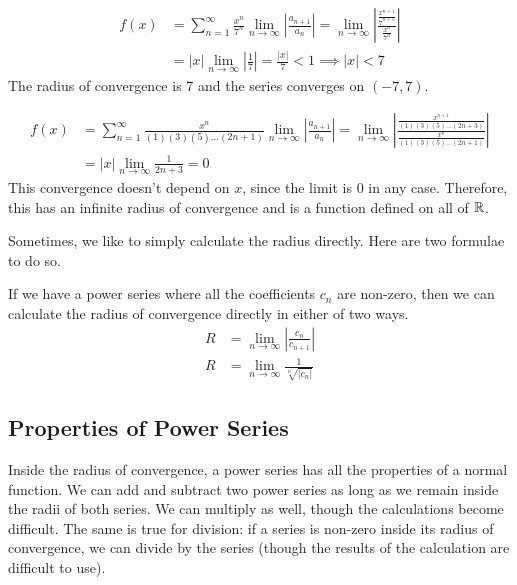 \documentclass[fleqn]{report}
\begin{document}
\begin{example}
\begin{align*}
f(x) & = \sum_{n=1}^\infty \frac{x^n}{7^n} 
\lim_{n \rightarrow \infty} \left| \frac{a_{n+1}}{a_n} \right| = 
\lim_{n \rightarrow \infty} \left|
\frac{\frac{x^{n+1}}{7^{n+1}}}{\frac{x^n}{7^n}} \right| \\
& = |x| \lim_{n \rightarrow \infty} \left| \frac{1}{7} \right| =
\frac{|x|}{7} < 1 \implies |x| < 7 
\end{align*}
The radius of convergence is 7 and the series converges on
$(-7,7)$.
\end{example}

\begin{example}
\begin{align*}
f(x) & = \sum_{n=1}^\infty \frac{x^n}{(1)(3)(5) \ldots (2n+1)}
\lim_{n \rightarrow \infty} \left| \frac{a_{n+1}}{a_n} \right| = 
\lim_{n \rightarrow \infty} \left|
\frac{\frac{x^{n+1}}{(1)(3)(5) \ldots
(2n+3)}}{\frac{x^n}{(1)(3)(5)\ldots (2n+1)}} \right|\\
& = |x| \lim_{n \rightarrow \infty} \frac{1}{2n+3} = 0
\end{align*}
This convergence doesn't depend on $x$, since the limit is $0$
in any case. Therefore, this has an infinite radius of
convergence and is a function defined on all of $\mathbb{R}$.
\end{example}

Sometimes, we like to simply calculate the radius directly.
Here are two formulae to do so. 

\begin{prop}
If we have a power series where all the coefficients $c_n$ are
non-zero, then we can calculate the radius of convergence
directly in either of two ways.
\begin{align*}
R & = \lim_{n \rightarrow \infty} \left| \frac{c_n}{c_{n+1}}
\right| \\
R & = \lim_{n \rightarrow \infty} \frac{1}{\sqrt[n]{|c_n|}} 
\end{align*}
\end{prop}

\subsection{Properties of Power Series}
\label{power-series-properties}

Inside the radius of convergence, a power series has all the
properties of a normal function. We can add and subtract two
power series as long as we remain inside the radii of both
series. We can multiply as well, though the calculations
become difficult. The same is true for division: if a series
is non-zero inside its radius of convergence, we can divide
by the series (though the results of the calculation are difficult
to use).
\end{document}

